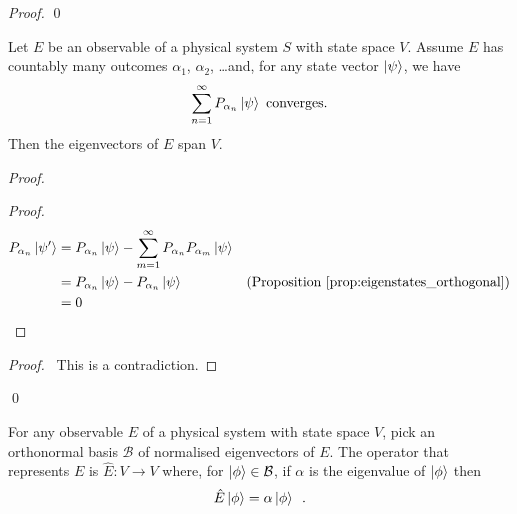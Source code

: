 \begin{proof}
\pf
{}
\qed
\end{proof}

\begin{prop}
Let $E$ be an observable of a physical system $S$ with state space $V$. Assume $E$ has countably many outcomes $\alpha_1$, $\alpha_2$, \ldots and, for any state vector $\left| {\psi} \right\rangle$, we have
\[ \sum_{n=1}^\infty P_{\alpha_n} \left| {\psi} \right\rangle \text{ converges}. \]
Then the eigenvectors of $E$ span $V$.
\end{prop}

\begin{proof}
\pf
{}
\begin{proof}
	\pf
	\begin{align*}
		P_{\alpha_n} \left| {\psi'} \right\rangle & = P_{\alpha_n} \left| {\psi} \right\rangle - \sum_{m=1}^\infty P_{\alpha_n} P_{\alpha_m} \left| {\psi} \right\rangle \\
		& = P_{\alpha_n} \left| {\psi} \right\rangle - P_{\alpha_n} \left| {\psi} \right\rangle & (\text{Proposition \ref{prop:eigenstates_orthogonal}}) \\
		& = 0
	\end{align*}
\end{proof}
\qedstep
\begin{proof}
	\pf\ This is a contradiction.
\end{proof}
\qed
\end{proof}

\begin{df}
For any observable $E$ of a physical system with state space $V$, pick an orthonormal basis $\mathcal{B}$ of normalised eigenvectors of $E$. The operator that represents $E$ is $\hat{E} : V \rightarrow V$ where, for $\left| {\phi} \right\rangle \in \mathcal{B}$, if $\alpha$ is the eigenvalue of $\left| {\phi} \right\rangle$ then
\[ \hat{E} \left| {\phi} \right\rangle = \alpha \left| {\phi} \right\rangle \enspace . \]
\end{df}

